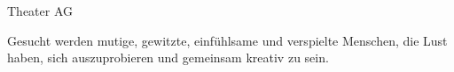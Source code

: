 \begin{initiativkarte}{Theater AG}
  \vspace{0.5cm}

  Gesucht werden mutige, gewitzte, einfühlsame und verspielte Menschen, die Lust haben, sich auszuprobieren und gemeinsam kreativ zu sein.

  \vspace{0.5cm}


  \vspace{0.6cm}
  \hawrule


\end{initiativkarte}